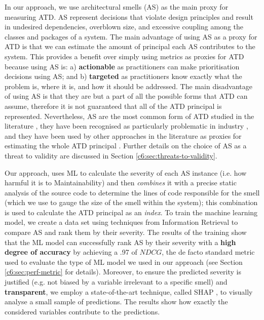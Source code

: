 In our approach, we use architectural smells (AS) as the main proxy for measuring ATD.
AS represent decisions that violate design principles and result in undesired dependencies, overblown size, and excessive coupling \cite{Lippert2006,Garcia2009} among the classes and packages of a system.
The main advantage of using AS as a proxy for ATD is that we can estimate the amount of principal each AS contributes to the system. 
This provides a benefit over simply using metrics as proxies for ATD because using AS is: a) \textbf{actionable} as practitioners can make prioritisation decisions using AS; and b) \textbf{targeted} as practitioners know exactly what the problem is, where it is, and how it should be addressed.
The main disadvantage of using AS is that they are but a part of all the possible forms that ATD can assume, therefore it is not guaranteed that all of the ATD principal is represented.
Nevertheless, AS are the most common form of ATD studied in the literature \cite{Verdecchia2018}, they have been recognised as particularly problematic in industry \cite{Arcelli2020,Sas2021b}, and  they have been used by other approaches in the literature as proxies for estimating the whole ATD principal \cite{Xiao2016,Roveda2018}. 
Further details on the choice of AS as a threat to validity are discussed in Section \ref{c6:sec:threats-to-validity}.

Our approach, uses ML to calculate the severity of each AS instance (i.e. how harmful it is to Maintainability) and then \emph{combines} it with a precise static analysis of the source code to determine the lines of code responsible for the smell (which we use to gauge the size of the smell within the system); this combination is used to calculate the ATD principal as an \emph{index}.
To train the machine learning model, we create a data set using techniques from Information Retrieval to compare AS and rank them by their severity.
The results of the training show that the ML model can successfully rank AS by their severity with a \textbf{high degree of accuracy} by achieving a .97 of $NDCG$, the de facto standard metric used to evaluate the type of ML model we used in our approach (see Section \ref{c6:sec:perf-metric} for details).
Moreover, to ensure the predicted severity is justified (e.g. not biased by a variable irrelevant to a specific smell) and \textbf{transparent}, we employ a state-of-the-art technique, called SHAP \cite{Strumbelj2014}, to visually analyse a small sample of predictions.
The results show how exactly the considered variables contribute to the predictions.

